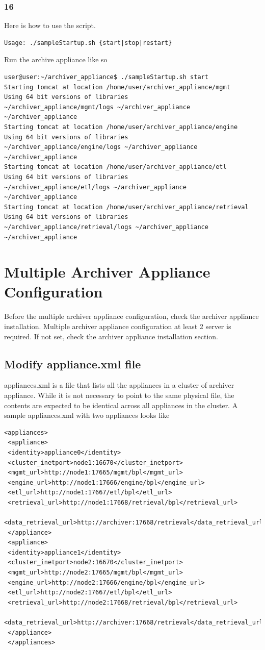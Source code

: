 \documentclass[11pt
  , a4paper
  , article
  , oneside
]{memoir}
\begin{document}
\subsection{16}
Here is how to use the script.
\begin{lstlisting}[style=termstyle]
Usage: ./sampleStartup.sh {start|stop|restart}
\end{lstlisting}
Run the archive appliance like so
\begin{lstlisting}[style=termstyle]
user@user:~/archiver_appliance$ ./sampleStartup.sh start
Starting tomcat at location /home/user/archiver_appliance/mgmt
Using 64 bit versions of libraries
~/archiver_appliance/mgmt/logs ~/archiver_appliance
~/archiver_appliance
Starting tomcat at location /home/user/archiver_appliance/engine
Using 64 bit versions of libraries
~/archiver_appliance/engine/logs ~/archiver_appliance
~/archiver_appliance
Starting tomcat at location /home/user/archiver_appliance/etl
Using 64 bit versions of libraries
~/archiver_appliance/etl/logs ~/archiver_appliance
~/archiver_appliance
Starting tomcat at location /home/user/archiver_appliance/retrieval
Using 64 bit versions of libraries
~/archiver_appliance/retrieval/logs ~/archiver_appliance
~/archiver_appliance
\end{lstlisting}

\clearpage

\chapter{Multiple Archiver Appliance Configuration}
Before the multiple archiver appliance configuration, check the archiver appliance installation. Multiple archiver appliance configuration at least 2 server is required. If not set, check the archiver appliance installation section.
\section{Modify appliance.xml file}
appliances.xml is a file that lists all the appliances in a cluster of archiver appliance. While it is not necessary to point to the same physical file, the contents are expected to be identical across all appliances in the cluster. A sample appliances.xml with two appliances looks like
\begin{lstlisting}[style=termstyle]
 <appliances>
 <appliance>
 <identity>appliance0</identity>
 <cluster_inetport>node1:16670</cluster_inetport>
 <mgmt_url>http://node1:17665/mgmt/bpl</mgmt_url>
 <engine_url>http://node1:17666/engine/bpl</engine_url>
 <etl_url>http://node1:17667/etl/bpl</etl_url>
 <retrieval_url>http://node1:17668/retrieval/bpl</retrieval_url>
 <data_retrieval_url>http://archiver:17668/retrieval</data_retrieval_url>
 </appliance>
 <appliance>
 <identity>appliance1</identity>
 <cluster_inetport>node2:16670</cluster_inetport>
 <mgmt_url>http://node2:17665/mgmt/bpl</mgmt_url>
 <engine_url>http://node2:17666/engine/bpl</engine_url>
 <etl_url>http://node2:17667/etl/bpl</etl_url>
 <retrieval_url>http://node2:17668/retrieval/bpl</retrieval_url>
 <data_retrieval_url>http://archiver:17668/retrieval</data_retrieval_url>
 </appliance>
 </appliances>
\end{lstlisting}
\end{document}
